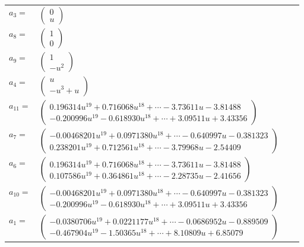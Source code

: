 \documentclass[1p]{elsarticle_modified}
\theoremstyle{definition}
\begin{document}
\begin{tabular}{m{7pt} m{180pt} m{7pt} m{180pt} }
\flushright $a_{3}=$&$\begin{pmatrix}0\\u\end{pmatrix}$ \\
\flushright $a_{8}=$&$\begin{pmatrix}1\\0\end{pmatrix}$ \\
\flushright $a_{9}=$&$\begin{pmatrix}1\\- u^2\end{pmatrix}$ \\
\flushright $a_{4}=$&$\begin{pmatrix}u\\- u^3+u\end{pmatrix}$ \\
\flushright $a_{11}=$&$\begin{pmatrix}0.196314 u^{19}+0.716068 u^{18}+\cdots-3.73611 u-3.81488\\-0.200996 u^{19}-0.618930 u^{18}+\cdots+3.09511 u+3.43356\end{pmatrix}$ \\
\flushright $a_{7}=$&$\begin{pmatrix}-0.00468201 u^{19}+0.0971380 u^{18}+\cdots-0.640997 u-0.381323\\0.238201 u^{19}+0.712561 u^{18}+\cdots-3.79968 u-2.54409\end{pmatrix}$ \\
\flushright $a_{6}=$&$\begin{pmatrix}0.196314 u^{19}+0.716068 u^{18}+\cdots-3.73611 u-3.81488\\0.107586 u^{19}+0.364861 u^{18}+\cdots-2.28735 u-2.41656\end{pmatrix}$ \\
\flushright $a_{10}=$&$\begin{pmatrix}-0.00468201 u^{19}+0.0971380 u^{18}+\cdots-0.640997 u-0.381323\\-0.200996 u^{19}-0.618930 u^{18}+\cdots+3.09511 u+3.43356\end{pmatrix}$ \\
\flushright $a_{1}=$&$\begin{pmatrix}-0.0380706 u^{19}+0.0221177 u^{18}+\cdots-0.0686952 u-0.889509\\-0.467904 u^{19}-1.50365 u^{18}+\cdots+8.10809 u+6.85079\end{pmatrix}$ \\

\end{tabular}
\end{document}
